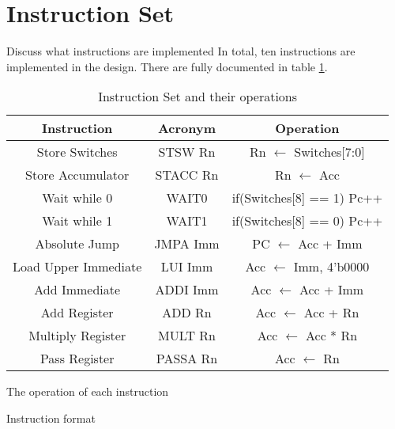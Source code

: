 

\section{Instruction Set}

Discuss what instructions are implemented
In total, ten instructions are implemented in the design.
There are fully documented in table \ref{tab:isa}. 

\begin{table}
\caption{Instruction Set and their operations}
\label{tab:isa}
\begin{tabular}{ccc} \hline 
Instruction & Acronym & Operation \\ \hline
Store Switches & STSW Rn & Rn $\leftarrow$ Switches[7:0] \\
Store Accumulator & STACC Rn & Rn $\leftarrow$ Acc \\
Wait while 0 & WAIT0 & if(Switches[8] == 1) Pc++ \\
Wait while 1 & WAIT1 & if(Switches[8] == 0) Pc++ \\
Absolute Jump & JMPA Imm & PC $\leftarrow$ Acc + Imm \\
Load Upper Immediate & LUI Imm & Acc $\leftarrow$ {Imm, 4'b0000} \\
Add Immediate & ADDI Imm & Acc $\leftarrow$ Acc + Imm \\
Add Register & ADD Rn & Acc $\leftarrow$ Acc + Rn \\
Multiply Register & MULT Rn & Acc $\leftarrow$ Acc * Rn \\
Pass Register & PASSA Rn & Acc $\leftarrow$ Rn \\ \hline
\end{tabular}
\end{table}


The operation of each instruction

Instruction format

